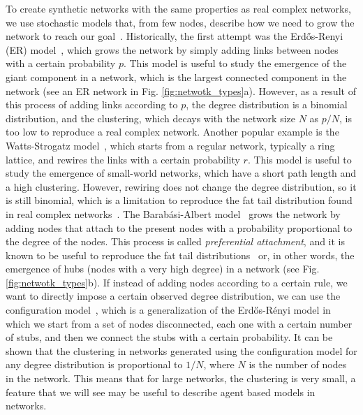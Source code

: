 To create synthetic networks with the same properties as real complex networks, we use stochastic models that, from few nodes, describe how we need to grow the network to reach our goal~\cite{posfai2016network}. Historically, the first attempt was the Erd\H{o}s-Renyi (ER) model~\cite{erdos1960evolution}, which grows the network by simply adding links between nodes with a certain probability $p$. This model is useful to study the emergence of the giant component in a network, which is the largest connected component in the network (see an ER network in Fig. \ref{fig:netwotk_types}a). However, as a result of this process of adding links according to $p$, the degree distribution is a binomial distribution, and the clustering, which decays with the network size $N$ as $p/N$, is too low to reproduce a real complex network. Another popular example is the Watts-Strogatz model~\cite{watts1998collective}, which starts from a regular network, typically a ring lattice, and rewires the links with a certain probability $r$. This model is useful to study the emergence of small-world networks, which have a short path length and a high clustering. However, rewiring does not change the degree distribution, so it is still binomial, which is a limitation to reproduce the fat tail distribution found in real complex networks~\cite{newman2003structure}. The Barab\'asi-Albert model~\cite{barabasi1999emergence} grows the network by adding nodes that attach to the present nodes with a probability proportional to the degree of the nodes. This process is called \textit{preferential attachment}, and it is known to be useful to reproduce the fat tail distributions~\cite{merton1968matthew} or, in other words, the emergence of hubs (nodes with a very high degree) in a network (see Fig. \ref{fig:netwotk_types}b). If instead of adding nodes according to a certain rule, we want to directly impose a certain observed degree distribution, we can use the configuration model~\cite{newman-book}, which is a generalization of the Erd\H{o}s-R\'enyi model in which we start from a set of nodes disconnected, each one with a certain number of stubs, and then we connect the stubs with a certain probability. It can be shown that the clustering in networks generated using the configuration model for any degree distribution is proportional to $1/N$, where $N$ is the number of nodes in the network. This means that for large networks, the clustering is very small, a feature that we will see may be useful to describe agent based models in networks.

